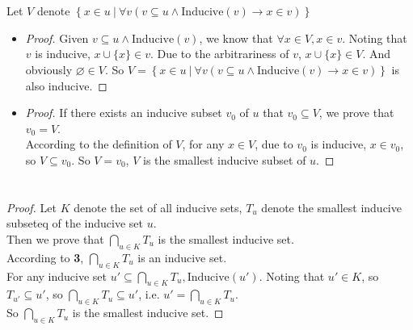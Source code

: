 \documentclass{article}
\begin{document}
\section{}

Let $V$ denote $ \left\{x \in u\ | \ \forall v (v \subseteq u \land \mathrm{Inducive}(v)\rightarrow x \in v)\right\}$

\begin{itemize}
    \item \begin{proof}
        Given $v \subseteq u \land \mathrm{Inducive}(v)$, we know that $\forall x \in V, x \in v$. Noting that $v$ is inducive, $x \cup \{x\} \in v$. Due to the arbitrariness of $v$, $x \cup \{x\} \in V$. And obviously $\varnothing \in V$. So $V = \left\{x \in u\ | \ \forall v (v \subseteq u \land \mathrm{Inducive}(v)\rightarrow x \in v)\right\}$ is also inducive. 
    \end{proof}
    \item \begin{proof}
        If there exists an inducive subset $v_0$ of $u$ that $v_0 \subseteq V$, we prove that $v_0 = V$. \\
        According to the definition of $V$, for any $x \in V$, due to $v_0$ is inducive, $x \in v_0$, so $V \subseteq v_0$. So $V = v_0$, $V$ is the smallest inducive subset of $u$.
    \end{proof}
\end{itemize}

\section{}

\begin{proof}
    Let $K$ denote the set of all inducive sets, $T_u$ denote the smallest inducive subseteq of the inducive set $u$. \\
    Then we prove that $\bigcap_{u \in K}T_u$ is the smallest inducive set. \\
    According to \textbf{3}, $\bigcap_{u \in K}T_u$ is an inducive set. \\
    For any inducive set $u' \subseteq \bigcap_{u \in K}T_u, \mathrm{Inducive}(u')$. Noting that $u' \in K$, so $T_{u'} \subseteq u'$, so $\bigcap_{u \in K}T_u \subseteq u'$, i.e. $u' = \bigcap_{u \in K}T_u$. \\
    So $\bigcap_{u \in K}T_u$ is the smallest inducive set.
\end{proof}
\end{document}
